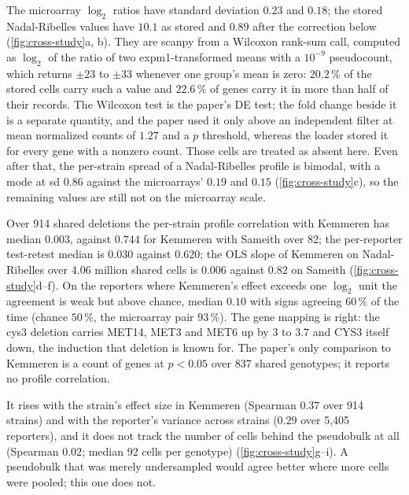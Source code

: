  The
microarray $\log_2$ ratios have standard deviation $0.23$ and $0.18$; the stored
Nadal-Ribelles values have $10.1$ as stored and $0.89$ after the correction below
(\cref{fig:cross-study}a, b). They are scanpy  from a Wilcoxon
rank-sum call, computed as $\log_2$ of the ratio of two expm1-transformed means with a
$10^{-9}$ pseudocount, which returns $\pm 23$ to $\pm 33$ whenever one group's mean is
zero: $20.2\,\%$ of the stored cells carry such a value and $22.6\,\%$ of genes carry it
in more than half of their records. The Wilcoxon test is the paper's DE test; the fold
change beside it is a separate quantity, and the paper used it only above an
independent filter at mean normalized counts of $1.27$ and a $p$ threshold, whereas the
loader stored it for every gene with a nonzero count. Those cells are treated as absent
here. Even after that, the per-strain spread of a Nadal-Ribelles profile is bimodal, with
a mode at sd $0.86$ against the microarrays' $0.19$ and $0.15$ (\cref{fig:cross-study}c),
so the remaining values are still not on the microarray scale.

 Over 914 shared
deletions the per-strain profile correlation with Kemmeren has median $0.003$, against
$0.744$ for Kemmeren with Sameith over 82; the per-reporter test-retest median is $0.030$
against $0.620$; the OLS slope of Kemmeren on Nadal-Ribelles over $4.06$ million shared
cells is $0.006$ against $0.82$ on Sameith (\cref{fig:cross-study}d--f). On the
reporters where Kemmeren's effect exceeds one $\log_2$ unit the agreement is weak but
above chance, median $0.10$ with signs agreeing $60\,\%$ of the time (chance $50\,\%$,
the microarray pair $93\,\%$). The gene mapping is right: the cys3 deletion carries MET14,
MET3 and MET6 up by $3$ to $3.7$ and CYS3 itself down, the induction that deletion is
known for. The paper's only comparison to Kemmeren is a count of genes at $p < 0.05$ over
837 shared genotypes; it reports no profile correlation.

 It rises with the strain's effect size in Kemmeren
(Spearman $0.37$ over 914 strains) and with the reporter's variance across strains
($0.29$ over 5{,}405 reporters), and it does not track the number of cells behind the
pseudobulk at all (Spearman $0.02$; median 92 cells per genotype)
(\cref{fig:cross-study}g--i). A pseudobulk that was merely undersampled would agree
better where more cells were pooled; this one does not.

